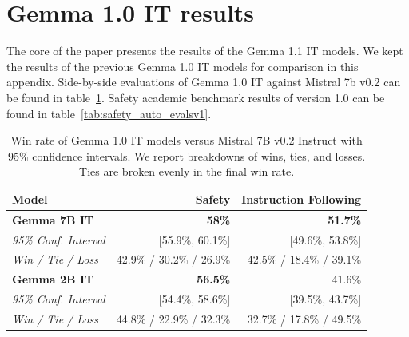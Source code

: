 \documentclass[11pt, a4paper, logo, twocolumn, copyright, nonumbering]{googledeepmind}
\begin{document}
\section{Gemma 1.0 IT results}
The core of the paper presents the results of the Gemma 1.1 IT models. We kept the results of the previous Gemma 1.0 IT models for comparison in this appendix. Side-by-side evaluations of Gemma 1.0 IT against Mistral 7b v0.2 can be found in table~\ref{tab:itv1}. Safety academic benchmark results of version 1.0 can be found in table~\ref{tab:safety_auto_evalsv1}.

\vspace{1cm}

\begin{table}[h]
    \setlength{\tabcolsep}{6pt}
    \centering
    \footnotesize
    \begin{tabular}{l r r}
    \toprule
    Model & Safety & Instruction Following \\
    \midrule
   \textbf{Gemma 7B IT} & \textbf{58\%} &  \textbf{51.7\%} \\
\tiny{\textit{95\% Conf. Interval}} & \tiny{[55.9\%, 60.1\%]} & \tiny{[49.6\%, 53.8\%]} \vspace{-0.05cm} \\
\tiny{\textit{Win / Tie / Loss}} & \tiny{42.9\% / 30.2\% / 26.9\%} & \tiny{42.5\% / 18.4\% / 39.1\%} \vspace{0.2cm} \\
   \textbf{Gemma 2B IT} & \textbf{56.5\%} &  41.6\% \\
\tiny{\textit{95\% Conf. Interval}} & \tiny{[54.4\%, 58.6\%]} & \tiny{[39.5\%, 43.7\%]}  \vspace{-0.05cm} \\
\tiny{\textit{Win / Tie / Loss}} & \tiny{44.8\% / 22.9\% / 32.3\%} & \tiny{32.7\% / 17.8\% / 49.5\%} \\
    \bottomrule
    \end{tabular}
    \caption{Win rate of Gemma 1.0 IT models versus Mistral 7B v0.2 Instruct with 95\% confidence intervals. We report breakdowns of wins, ties, and losses. Ties are broken evenly in the final win rate.}
    \label{tab:itv1}
\end{table}

\vspace{1cm}
\end{document}
